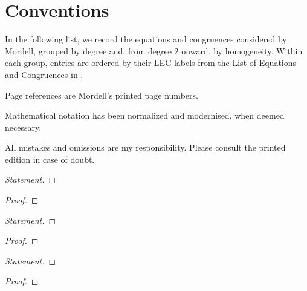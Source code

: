 
\section*{Conventions}

In the following list, we record the equations and congruences considered by Mordell,
grouped by degree and, from degree $2$ onward, by homogeneity. Within each group,
entries are ordered by their LEC labels from the List of Equations and Congruences in
\cite[pp.~307--312]{mordell-diophantine-equations}.

Page references are Mordell's printed page numbers.

Mathematical notation has been normalized and modernised, when deemed necessary.

All mistakes and omissions are my responsibility. Please consult the printed edition in case of doubt.






\begin{proof}[Statement]\renewcommand{\qedsymbol}{}

\end{proof}
\begin{proof}[Proof]\renewcommand{\qedsymbol}{}

\end{proof}


\begin{proof}[Statement]\renewcommand{\qedsymbol}{}

\end{proof}
\begin{proof}[Proof]\renewcommand{\qedsymbol}{}

\end{proof}


\begin{proof}[Statement]\renewcommand{\qedsymbol}{}

\end{proof}
\begin{proof}[Proof]\renewcommand{\qedsymbol}{}

\end{proof}

